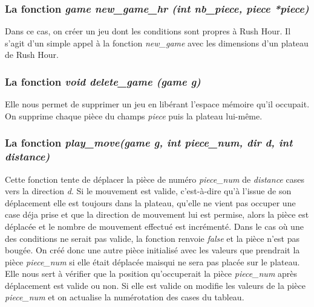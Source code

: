 \documentclass{report}
\begin{document}
\subsubsection{La fonction \textit{game new\_game\_hr (int nb\_piece, piece *piece)}}
Dans ce cas, on créer un jeu dont les conditions sont propres à Rush Hour.
Il s'agit d'un simple appel à la fonction \textit{new\_game} avec les dimensions d'un plateau de Rush Hour.
\subsubsection{La fonction \textit{void delete\_game (game g)}}
Elle nous permet de supprimer un jeu en libérant l'espace mémoire qu'il occupait. On supprime chaque pièce du champs \textit{piece} puis la plateau lui-même.
\subsubsection{La fonction \textit{play\_move(game g, int piece\_num, dir d, int distance)}}
Cette fonction tente de déplacer la pièce de numéro \textit{piece\_num} de \textit{distance} cases vers la direction \textit{d}. Si le mouvement est valide, c'est-à-dire qu'à l'issue de son déplacement elle est toujours dans la plateau, qu'elle ne vient pas occuper une case déja prise et que la direction de mouvement lui est permise, alors la pièce est déplacée et le nombre de mouvement effectué est incrémenté. Dans le cas où une des conditions ne serait pas valide, la fonction renvoie \textit{false} et la pièce n'est pas bougée.
On créé donc une autre pièce initialisé avec les valeurs que prendrait la pièce \textit{piece\_num} si elle était déplacée maisqui ne sera pas placée sur le plateau. Elle nous sert à vérifier que la position qu'occuperait la pièce \textit{piece\_num} après déplacement est valide ou non. Si elle est valide on modifie les valeurs de la pièce \textit{piece\_num} et on actualise la numérotation des cases du tableau.
\end{document}
